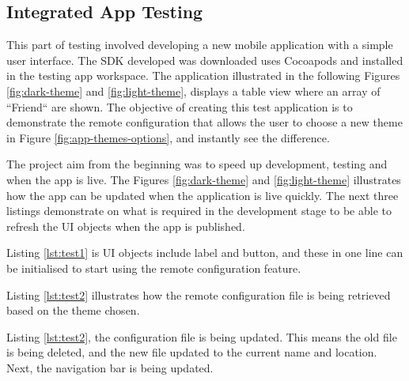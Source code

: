 \newpage

\subsection{Integrated App Testing}

This part of testing involved developing a new mobile application with a simple user interface. The SDK developed was downloaded uses Cocoapods and installed in the testing app workspace. The application illustrated in the following Figures \ref{fig:dark-theme} and \ref{fig:light-theme}, displays a table view where an array of “Friend“ are shown. The objective of creating this test application is to demonstrate the remote configuration that allows the user to choose a new theme in Figure \ref{fig:app-themes-options}, and instantly see the difference.

The project aim from the beginning was to speed up development, testing and when the app is live. The Figures \ref{fig:dark-theme} and \ref{fig:light-theme} illustrates how the app can be updated when the application is live quickly. The next three listings demonstrate on what is required in the development stage to be able to refresh the UI objects when the app is published.

Listing \ref{lst:test1} is UI objects include label and button, and these in one line can be initialised to start using the remote configuration feature.



Listing \ref{lst:test2} illustrates how the remote configuration file is being retrieved based on the theme chosen.



Listing \ref{lst:test2}, the configuration file is being updated. This means the old file is being deleted, and the new file updated to the current name and location. Next, the navigation bar is being updated.



